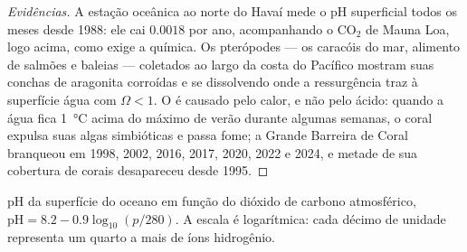 \begin{proof}[Evidências]
A estação oceânica ao norte do Havaí mede o pH superficial todos os meses
desde 1988: ele cai $0.0018$ por ano, acompanhando o
\ensuremath{\mathrm{CO_2}} de Mauna Loa, logo acima, como exige a química.
Os pterópodes --- os caracóis do mar, alimento de salmões e baleias ---
coletados ao largo da costa do Pacífico mostram suas conchas de aragonita
corroídas e se dissolvendo onde a ressurgência traz à superfície água
com $\Omega <
1$. O  é causado pelo calor, e não pelo ácido:
quando a água fica \qty{1}{\celsius} acima do máximo de verão durante
algumas semanas, o coral expulsa suas algas simbióticas e passa fome; a
Grande Barreira de Coral branqueou em 1998, 2002, 2016, 2017, 2020, 2022
e 2024, e metade de sua cobertura de corais desapareceu desde 1995.
\end{proof}

\begin{omfigure}

{\small pH da superfície do oceano em função do dióxido de carbono
atmosférico, $\mathrm{pH} = 8.2 - 0.9\log_{10}(p/280)$. A escala é
logarítmica: cada décimo de unidade representa um quarto a mais de íons
hidrogênio.}
\end{omfigure}

